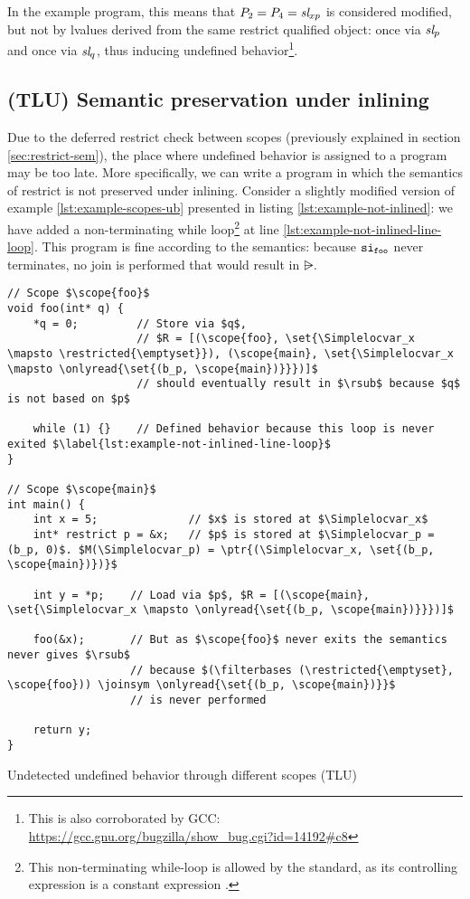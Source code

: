 In the example program, this means that $P_2 = P_4 = \textit{sl}_{xp}$ is considered modified, but not by lvalues derived from the same 
restrict qualified object: once via $\textit{sl}_{p}$ and once via $\textit{sl}_{q}$, thus inducing undefined behavior\footnote{This is also corroborated by GCC: \url{https://gcc.gnu.org/bugzilla/show_bug.cgi?id=14192\#c8}}.

\subsection{(TLU) Semantic preservation under inlining}\label{subsec:cink-inlining-semantics}
Due to the deferred restrict check between scopes (previously explained in section \ref{sec:restrict-sem}), the place where undefined behavior is assigned to a program may be too late.
More specifically, we can write a program in which the semantics of restrict is not preserved under inlining.
Consider a slightly modified version of example \ref{lst:example-scopes-ub} presented in listing \ref{lst:example-not-inlined}:
we have added a non-terminating while loop\footnote{This non-terminating while-loop is
allowed by the standard, as its controlling expression is a constant expression \cite[6.8.5, p6]{ISO:2018:III}.}
at line \ref{lst:example-not-inlined-line-loop}.
This program is fine according to the
semantics: because $\mathtt{si}_\mathtt{foo}$ never terminates, no join is performed that would result in $\rsub$. 
\begin{code}
\begin{verbatim}
// Scope $\scope{foo}$
void foo(int* q) {
    *q = 0;         // Store via $q$,
                    // $R = [(\scope{foo}, \set{\Simplelocvar_x \mapsto \restricted{\emptyset}}), (\scope{main}, \set{\Simplelocvar_x \mapsto \onlyread{\set{(b_p, \scope{main})}}})]$
                    // should eventually result in $\rsub$ because $q$ is not based on $p$ 

    while (1) {}    // Defined behavior because this loop is never exited $\label{lst:example-not-inlined-line-loop}$
}

// Scope $\scope{main}$
int main() {
    int x = 5;              // $x$ is stored at $\Simplelocvar_x$
    int* restrict p = &x;   // $p$ is stored at $\Simplelocvar_p = (b_p, 0)$. $M(\Simplelocvar_p) = \ptr{(\Simplelocvar_x, \set{(b_p, \scope{main})})}$

    int y = *p;    // Load via $p$, $R = [(\scope{main}, \set{\Simplelocvar_x \mapsto \onlyread{\set{(b_p, \scope{main})}}})]$

    foo(&x);       // But as $\scope{foo}$ never exits the semantics never gives $\rsub$
                   // because $(\filterbases (\restricted{\emptyset}, \scope{foo})) \joinsym \onlyread{\set{(b_p, \scope{main})}}$
                   // is never performed

    return y;
}
\end{verbatim}
\caption{Undetected undefined behavior through different scopes (TLU)}
\label{lst:example-not-inlined}
\end{code}
